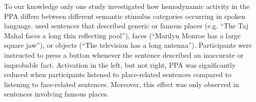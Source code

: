 \documentclass[english]{article}
\begin{document}
To our knowledge only one study \citep{aziz2008modulation} investigated how
hemodynamic activity in the PPA differs between different semantic stimulus
categories occurring in spoken language.
\cite{aziz2008modulation} used sentences that described generic or famous places
(e.g. ``The Taj Mahal faces a long thin reflecting pool''), faces (``Marilyn
Monroe has a large square jaw''), or objects (``The television has a long
antenna'').
Participants were instructed to press a button whenever the sentence described
an inaccurate or improbable fact.
Activation in the left, but not right, PPA was significantly reduced when
participants listened to place-related sentences compared to listening to
face-related sentences. Moreover, this effect was only observed in sentences
involving famous places.
\end{document}
